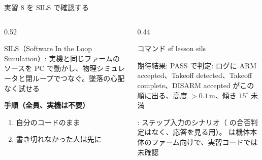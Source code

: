 \begin{frame}[fragile]{実習 8 を SILS で確認する}
  \begin{columns}[T]
    \begin{column}{0.52\textwidth}
      {\footnotesize SILS（Software In the Loop Simulation）: 実機と同じファームのソースを PC で動かし、物理シミュレータと閉ループでつなぐ。墜落の心配なく試せる\par}\vspace{2pt}
      {\footnotesize\textbf{\textcolor{sfblue}{手順（全員、実機は不要）}}}\par\vspace{-2pt}
      \footnotesize
      \begin{enumerate}\setlength{\itemsep}{0pt}
        \item 自分のコードのまま 
        \item 書き切れなかった人は先に 
      \end{enumerate}
    \end{column}
    \begin{column}{0.44\textwidth}
      \begin{sflisting}[basicstyle=\ttfamily\scriptsize]{コマンド}
sf lesson sils
      \end{sflisting}
      \begin{exampleblock}{期待結果: PASS}
        \scriptsize {} で判定: ログに ARM accepted、Takeoff detected、Takeoff complete、DISARM accepted がこの順に出る、高度 $>0.1$\,m、傾き $15^\circ$ 未満
      \end{exampleblock}
      {\scriptsize {}: ステップ入力のシナリオ（ の合否判定はなく、応答を見る用）。 は機体本体のファーム向けで、実習コードでは未確認\par}
    \end{column}
  \end{columns}
\end{frame}

